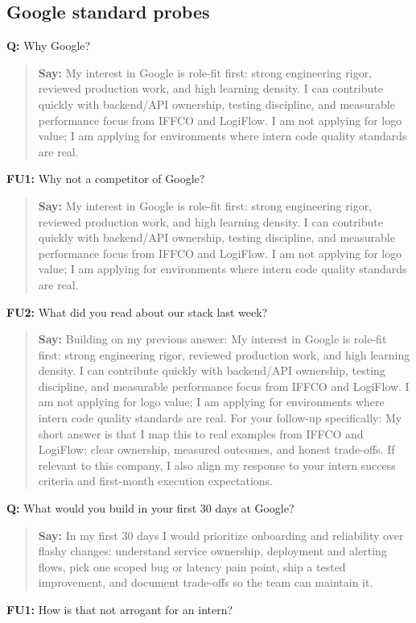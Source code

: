 \documentclass[9pt,a4paper]{article}
\begin{document}
\subsection{Google standard probes}
\textbf{Q:} Why Google?

\begin{quote}\small\textbf{Say:} My interest in Google is role-fit first: strong engineering rigor, reviewed production work, and high learning density. I can contribute quickly with backend/API ownership, testing discipline, and measurable performance focus from IFFCO and LogiFlow. I am not applying for logo value; I am applying for environments where intern code quality standards are real.\end{quote}
\vspace{2mm}
\textbf{FU1:} Why not a competitor of Google?

\begin{quote}\small\textbf{Say:} My interest in Google is role-fit first: strong engineering rigor, reviewed production work, and high learning density. I can contribute quickly with backend/API ownership, testing discipline, and measurable performance focus from IFFCO and LogiFlow. I am not applying for logo value; I am applying for environments where intern code quality standards are real.\end{quote}
\vspace{2mm}
\textbf{FU2:} What did you read about our stack last week?

\begin{quote}\small\textbf{Say:} Building on my previous answer: My interest in Google is role-fit first: strong engineering rigor, reviewed production work, and high learning density. I can contribute quickly with backend/API ownership, testing discipline, and measurable performance focus from IFFCO and LogiFlow. I am not applying for logo value; I am applying for environments where intern code quality standards are real. For your follow-up specifically: My short answer is that I map this to real examples from IFFCO and LogiFlow: clear ownership, measured outcomes, and honest trade-offs. If relevant to this company, I also align my response to your intern success criteria and first-month execution expectations.\end{quote}
\vspace{2mm}
\textbf{Q:} What would you build in your first 30 days at Google?

\begin{quote}\small\textbf{Say:} In my first 30 days I would prioritize onboarding and reliability over flashy changes: understand service ownership, deployment and alerting flows, pick one scoped bug or latency pain point, ship a tested improvement, and document trade-offs so the team can maintain it.\end{quote}
\vspace{2mm}
\textbf{FU1:} How is that not arrogant for an intern?
\end{document}
